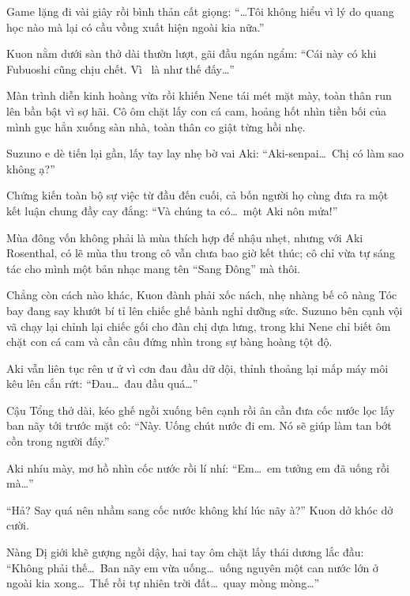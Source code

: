 \documentclass[../main.tex]{subfiles}
\begin{document}
Game lặng đi vài giây rồi bình thản cất giọng: ``\dots Tôi không hiểu vì lý do quang học nào mà lại có cầu vồng xuất hiện ngoài kia nữa.''

Kuon nằm dưới sàn thở dài thườn lượt, gãi đầu ngán ngẩm: ``Cái này có khi Fubuoshi cũng chịu chết. Vì \hll\ là như thế đấy\dots''

Màn trình diễn kinh hoàng vừa rồi khiến Nene tái mét mặt mày, toàn thân run lên bần bật vì sợ hãi. Cô ôm chặt lấy con cá cam, hoảng hốt nhìn tiền bối của mình gục hẳn xuống sàn nhà, toàn thân co giật từng hồi nhẹ.


Suzuno e dè tiến lại gần, lấy tay lay nhẹ bờ vai Aki: ``Aki-senpai\dots\ Chị có làm sao không ạ?''

Chứng kiến toàn bộ sự việc từ đầu đến cuối, cả bốn người họ cùng đưa ra một kết luận chung đầy cay đắng: ``Và chúng ta có\dots\ một Aki nôn mửa!''

Mùa đông vốn không phải là mùa thích hợp để nhậu nhẹt, nhưng với Aki Rosenthal, có lẽ mùa thu trong cô vẫn chưa bao giờ kết thúc; cô chỉ vừa tự sáng tác cho mình một bản nhạc mang tên ``Sang Đông'' mà thôi.

\omk

Chẳng còn cách nào khác, Kuon đành phải xốc nách, nhẹ nhàng bế cô nàng Tóc bay đang say khướt bí tỉ lên chiếc ghế bành nghỉ dưỡng sức. Suzuno bên cạnh vội vã chạy lại chỉnh lại chiếc gối cho đàn chị dựa lưng, trong khi Nene chỉ biết ôm chặt con cá cam và cần câu đứng nhìn trong sự bàng hoàng tột độ.


Aki vẫn liên tục rên ư ử vì cơn đau đầu dữ dội, thỉnh thoảng lại mấp máy môi kêu lên cắn rứt: ``Đau\dots\ đau đầu quá\dots''

Cậu Tổng thở dài, kéo ghế ngồi xuống bên cạnh rồi ân cần đưa cốc nước lọc lấy ban nãy tới trước mặt cô: ``Này. Uống chút nước đi em. Nó sẽ giúp làm tan bớt cồn trong người đấy.''

Aki nhíu mày, mơ hồ nhìn cốc nước rồi lí nhí: ``Em\dots\ em tưởng em đã uống rồi mà\dots''

``Hả? Say quá nên nhầm sang cốc nước không khí lúc nãy à?'' Kuon dở khóc dở cười.

Nàng Dị giới khẽ gượng ngồi dậy, hai tay ôm chặt lấy thái dương lắc đầu: ``Không phải thế\dots\ Ban nãy em vừa uống\dots\ uống nguyên một can nước lớn ở ngoài kia xong\dots\ Thế rồi tự nhiên trời đất\dots\ quay mòng mòng\dots''
\end{document}

